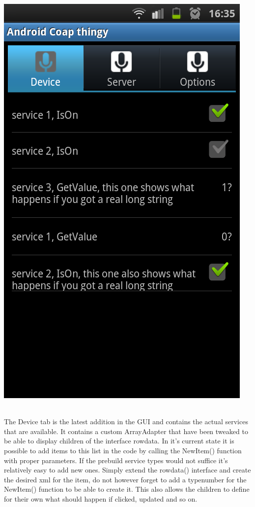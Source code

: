 \begin{center}
\includegraphics[scale=0.25]{android-device.png}%
\end{center}
\\The Device tab is the latest addition in the GUI and contains the actual services that are available. It contains a custom ArrayAdapter that have been tweaked to be able to display children of the interface rowdata.
In it's current state it is possible to add items to this list in the code by calling the NewItem() function with proper parameters. If the prebuild service types would not suffice it's relatively easy to add new ones.
Simply extend the rowdata() interface and create the desired xml for the item, do not however forget to add a typenumber for the NewItem() function to be able to create it. 
This also allows the children to define for their own what should happen if clicked, updated and so on.
